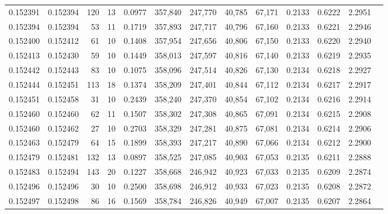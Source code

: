 \begin{tabular}{rrrrrrrrrrrrr}
0.152391 & 0.152394 &   120 &  13 &                                     0.0977 & 357,840 & 247,770 &  40,785 &  67,171 & 0.2133 & 0.6222 & 2.2951 \\
0.152394 & 0.152394 &    53 &  11 &                                     0.1719 & 357,893 & 247,717 &  40,796 &  67,160 & 0.2133 & 0.6221 & 2.2946 \\
0.152400 & 0.152412 &    61 &  10 &                                     0.1408 & 357,954 & 247,656 &  40,806 &  67,150 & 0.2133 & 0.6220 & 2.2940 \\
0.152413 & 0.152430 &    59 &  10 &                                     0.1449 & 358,013 & 247,597 &  40,816 &  67,140 & 0.2133 & 0.6219 & 2.2935 \\
0.152442 & 0.152443 &    83 &  10 &                                     0.1075 & 358,096 & 247,514 &  40,826 &  67,130 & 0.2134 & 0.6218 & 2.2927 \\
0.152444 & 0.152451 &   113 &  18 &                                     0.1374 & 358,209 & 247,401 &  40,844 &  67,112 & 0.2134 & 0.6217 & 2.2917 \\
0.152451 & 0.152458 &    31 &  10 &                                     0.2439 & 358,240 & 247,370 &  40,854 &  67,102 & 0.2134 & 0.6216 & 2.2914 \\
0.152460 & 0.152460 &    62 &  11 &                                     0.1507 & 358,302 & 247,308 &  40,865 &  67,091 & 0.2134 & 0.6215 & 2.2908 \\
0.152460 & 0.152462 &    27 &  10 &                                     0.2703 & 358,329 & 247,281 &  40,875 &  67,081 & 0.2134 & 0.6214 & 2.2906 \\
0.152463 & 0.152479 &    64 &  15 &                                     0.1899 & 358,393 & 247,217 &  40,890 &  67,066 & 0.2134 & 0.6212 & 2.2900 \\
0.152479 & 0.152481 &   132 &  13 &                                     0.0897 & 358,525 & 247,085 &  40,903 &  67,053 & 0.2135 & 0.6211 & 2.2888 \\
0.152483 & 0.152494 &   143 &  20 &                                     0.1227 & 358,668 & 246,942 &  40,923 &  67,033 & 0.2135 & 0.6209 & 2.2874 \\
0.152496 & 0.152496 &    30 &  10 &                                     0.2500 & 358,698 & 246,912 &  40,933 &  67,023 & 0.2135 & 0.6208 & 2.2872 \\
0.152497 & 0.152498 &    86 &  16 &                                     0.1569 & 358,784 & 246,826 &  40,949 &  67,007 & 0.2135 & 0.6207 & 2.2864 \\

\end{tabular}
